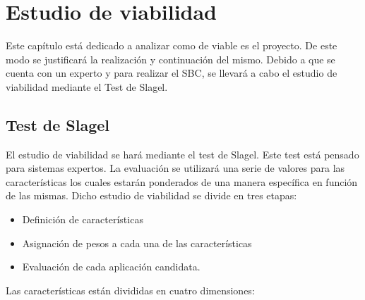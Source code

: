\chapter{Estudio de viabilidad}
\label{cap: Introducción y objetivos}

Este capítulo está dedicado a analizar como de viable es el proyecto. De este modo
se justificará la realización y continuación del mismo. Debido a que se cuenta con
un experto y para realizar el \acs{SBC}, se llevará a cabo
el estudio de viabilidad mediante el Test de Slagel.

\section{Test de Slagel}

El estudio de viabilidad se hará mediante el test de Slagel.
Este test está pensado para sistemas expertos. La evaluación se utilizará una serie
de valores para las características los cuales estarán ponderados de una manera
específica en función de las mismas. Dicho estudio de viabilidad se divide en tres etapas:

\begin{itemize}
  \item Definición de características
  \item Asignación de pesos a cada una de las características
  \item Evaluación de cada aplicación candidata.
\end{itemize}

Las características están divididas en cuatro dimensiones:

